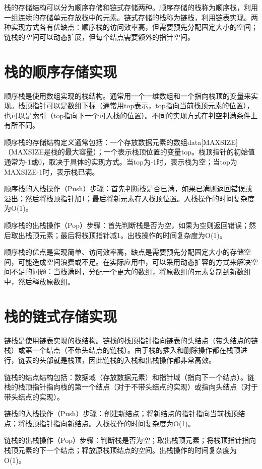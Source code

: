\documentclass[12pt, a4paper]{article}
\begin{document}
栈的存储结构可以分为顺序存储和链式存储两种。顺序存储的栈称为顺序栈，利用一组连续的存储单元存放栈中的元素。链式存储的栈称为链栈，利用链表实现。两种实现方式各有优缺点：顺序栈的访问效率高，但需要预先分配固定大小的空间；链栈的空间可以动态扩展，但每个结点需要额外的指针空间。

\section{栈的顺序存储实现}

顺序栈是使用数组实现的栈结构。通常用一个一维数组和一个指向栈顶的变量来实现。栈顶指针可以是数组下标（通常用top表示，top指向当前栈顶元素的位置），也可以是索引（top指向下一个可入栈的位置）。不同的实现方式在判空判满条件上有所不同。

顺序栈的存储结构定义通常包括：一个存放数据元素的数组data[MAXSIZE]（MAXSIZE是栈的最大容量）；一个表示栈顶位置的变量top。栈顶指针的初始值通常为-1或0，取决于具体的实现方式。当top为-1时，表示栈为空；当top为MAXSIZE-1时，表示栈已满。

顺序栈的入栈操作（Push）步骤：首先判断栈是否已满，如果已满则返回错误或溢出；然后将栈顶指针加1；最后将新元素存入栈顶位置。入栈操作的时间复杂度为O(1)。

顺序栈的出栈操作（Pop）步骤：首先判断栈是否为空，如果为空则返回错误；然后取出栈顶元素；最后将栈顶指针减1。出栈操作的时间复杂度为O(1)。

顺序栈的优点是实现简单、访问效率高，缺点是需要预先分配固定大小的存储空间，可能造成空间浪费或不足。在实际应用中，可以采用动态扩容的方式来解决空间不足的问题：当栈满时，分配一个更大的数组，将原数组的元素复制到新数组中，然后释放原数组。

\section{栈的链式存储实现}

链栈是使用链表实现的栈结构。链栈的栈顶指针指向链表的头结点（带头结点的链栈）或第一个结点（不带头结点的链栈）。由于栈的插入和删除操作都在栈顶进行，链表的头部就是栈顶，因此链栈的入栈和出栈操作都非常高效。

链栈的结点结构包括：数据域（存放数据元素）和指针域（指向下一个结点）。链栈的栈顶指针指向栈的第一个结点（对于不带头结点的实现）或指向头结点（对于带头结点的实现）。

链栈的入栈操作（Push）步骤：创建新结点；将新结点的指针指向当前栈顶结点；将栈顶指针指向新结点。入栈操作的时间复杂度为O(1)。

链栈的出栈操作（Pop）步骤：判断栈是否为空；取出栈顶元素；将栈顶指针指向栈顶元素的下一个结点；释放原栈顶结点的空间。出栈操作的时间复杂度为O(1)。
\end{document}
